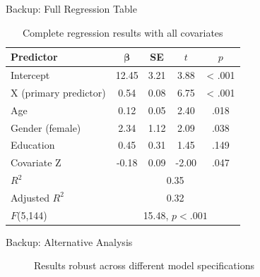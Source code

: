 \documentclass[aspectratio=169,11pt]{beamer}
\begin{document}
\begin{frame}{Backup: Full Regression Table}
  \begin{table}
    \centering
    \caption{Complete regression results with all covariates}
    \footnotesize
    \begin{tabular}{lcccc}
      \toprule
      \textbf{Predictor} & $\boldsymbol{\beta}$ & \textbf{SE} & \textbf{$t$} & \textbf{$p$} \\
      \midrule
      Intercept & 12.45 & 3.21 & 3.88 & < .001 \\
      X (primary predictor) & 0.54 & 0.08 & 6.75 & < .001 \\
      Age & 0.12 & 0.05 & 2.40 & .018 \\
      Gender (female) & 2.34 & 1.12 & 2.09 & .038 \\
      Education & 0.45 & 0.31 & 1.45 & .149 \\
      Covariate Z & -0.18 & 0.09 & -2.00 & .047 \\
      \midrule
      $R^2$ & \multicolumn{4}{c}{0.35} \\
      Adjusted $R^2$ & \multicolumn{4}{c}{0.32} \\
      $F$(5,144) & \multicolumn{4}{c}{15.48, $p < .001$} \\
      \bottomrule
    \end{tabular}
  \end{table}
\end{frame}

\begin{frame}{Backup: Alternative Analysis}
  \begin{figure}
    \centering
    \caption{Results robust across different model specifications}
  \end{figure}
\end{frame}
\end{document}

